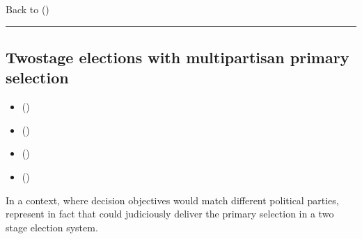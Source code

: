 \documentclass[a4paper,12pt,english]{sphinxhowto}
\begin{document}
\sphinxAtStartPar
Back to {\hyperref[\detokenize{pearls:pearls-label}]{}} ()


\bigskip\hrule\bigskip



\subsection{Two\sphinxhyphen{}stage elections with multipartisan primary selection}
\label{\detokenize{pearls:two-stage-elections-with-multipartisan-primary-selection}}\label{\detokenize{pearls:two-stage-elections-label}}
\begin{sphinxcontents}
\begin{itemize}
\item {} 
\sphinxAtStartPar
{}\label{\detokenize{pearls:id157}}{\hyperref[\detokenize{pearls:converting-voting-profiles-into-performance-tableaux}]{}} ()

\item {} 
\sphinxAtStartPar
{}\label{\detokenize{pearls:id158}}{\hyperref[\detokenize{pearls:multipartisan-primary-selection-of-eligible-candidates}]{}} ()

\item {} 
\sphinxAtStartPar
{}\label{\detokenize{pearls:id159}}{\hyperref[\detokenize{pearls:secondary-election-winner-determination}]{}} ()

\item {} 
\sphinxAtStartPar
{}\label{\detokenize{pearls:id160}}{\hyperref[\detokenize{pearls:multipartisan-preferences-in-divisive-politics}]{}} ()

\end{itemize}
\end{sphinxcontents}

\sphinxAtStartPar
In a  context, where decision objectives would match different political parties,  represent in fact  that could judiciously deliver the primary selection in a two stage election system.
\end{document}
